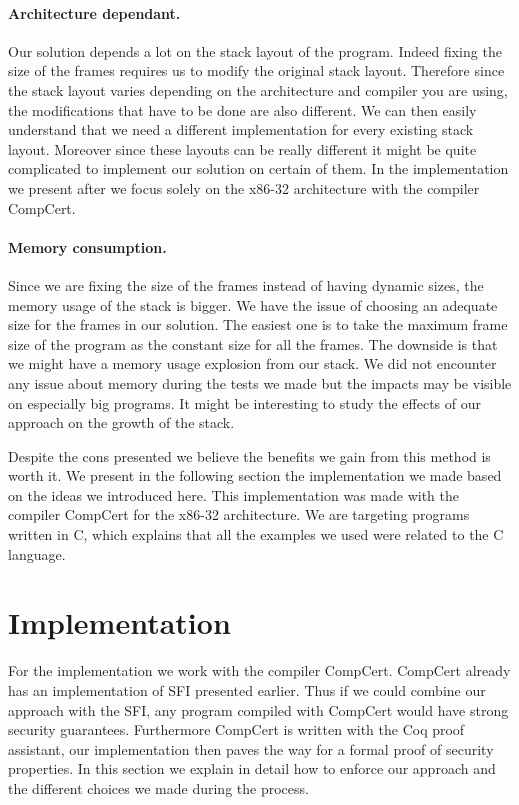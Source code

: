 \documentclass[11pt]{sdm}
\begin{document}
\paragraph{Architecture dependant.}
\label{par:Architecture dependant}
Our solution depends a lot on the stack layout of the program.
Indeed fixing the size of the frames requires us to modify the original stack layout.
Therefore since the stack layout varies depending on the architecture and compiler you are using, the modifications that have to be done are also different.
We can then easily understand that we need a different implementation for every existing stack layout.
Moreover since these layouts can be really different it might be quite complicated to implement our solution on certain of them.
In the implementation we present after we focus solely on the x86-32 architecture with the compiler CompCert.

\paragraph{Memory consumption.}
\label{par:Memory consumption}
Since we are fixing the size of the frames instead of having dynamic sizes, the memory usage of the stack is bigger. We have the issue of choosing an adequate size for the frames in our solution. The easiest one is to take the maximum frame size of the program as the constant size for all the frames. The downside is that we might have a memory usage explosion from our stack.
We did not encounter any issue about memory during the tests we made but the impacts may be visible on especially big programs. It might be interesting to study the effects of our approach on the growth of the stack.

Despite the cons presented we believe the benefits we gain from this method is worth it.
We present in the following section the implementation we made based on the ideas we introduced here. This implementation was made with the compiler CompCert for the x86-32 architecture. We are targeting programs written in C, which explains that all the examples we used were related to the C language.


\newpage
\section{Implementation}
\label{sec:implementation}

For the implementation we work with the compiler CompCert. CompCert already has an implementation of SFI presented earlier. Thus if we could combine our approach with the SFI, any program compiled with CompCert would have strong security guarantees. Furthermore CompCert is written with the Coq proof assistant, our implementation then paves the way for a formal proof of security properties. In this section we explain in detail how to enforce our approach and the different choices we made during the process.
\end{document}
